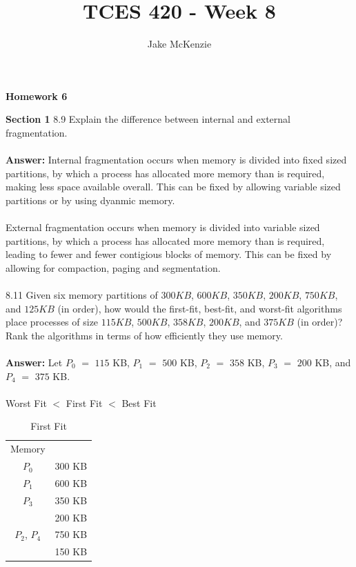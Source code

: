 \documentclass[12pt]{article}
\begin{document}
\title{TCES 420 - Week 8}
\author{Jake McKenzie}
\maketitle
\noindent\centerline{\textbf{Homework 6}}
\textbf{Section 1}
8.9 Explain the difference between internal and external fragmentation.
\\\\
\textbf{Answer: }Internal fragmentation occurs when memory is divided into fixed sized partitions, by 
which a process has allocated more memory than is required, making less space available 
overall. This can be fixed by allowing variable sized partitions or by using dyanmic memory. 
\\\\
External fragmentation occurs when memory is divided into variable sized partitions, by 
which a process has allocated more memory than is required, leading to fewer and fewer 
contigious blocks of memory. This can be fixed by allowing for compaction, paging and 
segmentation.
\\\\
8.11 Given six memory partitions of $300 KB$, $600 KB$, $350 KB$, $200 KB$, $750 KB$,
and $125 KB$ (in order), how would the first-fit, best-fit, and worst-fit
algorithms place processes of size $115 KB$, $500 KB$, $358 KB$, $200 KB$, and
$375 KB$ (in order)? Rank the algorithms in terms of how efficiently they
use memory.
\\\\
\textbf{Answer: } Let $P_0$ $=$ $115$ KB, $P_1$ $=$ $500$ KB, $P_2$ $=$ $358$ KB, 
$P_3$ $=$ $200$ KB, and $P_4$ $=$ $375$ KB.
\\\\
Worst Fit $<$ First Fit $<$ Best Fit
\\
\begin{table}[htb]
\centering
\caption{First Fit}
\begin{tabular}{|c|c}
\cline{1-1}
Memory      &                               \\ \cline{1-1}
$P_0$       & 300 KB                        \\ \cline{1-1}
$P_1$       & 600 KB                        \\ \cline{1-1}
$P_3$       & 350 KB                        \\ \cline{1-1}
            & 200 KB                        \\ \cline{1-1}
$P_2$, $P_4$       & 750 KB                        \\ \cline{1-1}
            & 150 KB                        \\ \cline{1-1}
\end{tabular}
\end{table}
\end{document}
